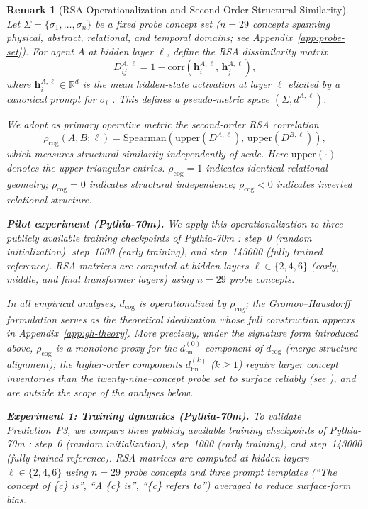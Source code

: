 \documentclass[12pt]{article}
\newtheorem{remark}{Remark}
\begin{document}
\begin{remark}[RSA Operationalization and Second-Order Structural Similarity]
\label{rem:rsa-operationalization}
Let $\Sigma = \{\sigma_1, \ldots, \sigma_n\}$ be a fixed probe concept
set ($n = 29$ concepts spanning physical, abstract, relational,
and temporal domains; see Appendix~\ref{app:probe-set}).
For agent $A$ at hidden layer $\ell$, define the RSA dissimilarity matrix
\[
D^{A,\ell}_{ij} = 1 - \mathrm{corr}(\mathbf{h}^{A,\ell}_i,\, \mathbf{h}^{A,\ell}_j),
\]
where $\mathbf{h}^{A,\ell}_i \in \mathbb{R}^d$ is the mean hidden-state
activation at layer $\ell$ elicited by a canonical prompt for $\sigma_i$
\cite{kriegeskorte2008}.
This defines a pseudo-metric space $(\Sigma, d^{A,\ell})$.

We adopt as primary operative metric the \emph{second-order RSA correlation}
\[
\rho_\mathrm{cog}(A, B;\ell)
  = \mathrm{Spearman}\!\left(
      \mathrm{upper}(D^{A,\ell}),\,
      \mathrm{upper}(D^{B,\ell})
    \right),
\]
which measures structural similarity independently of scale.
Here $\mathrm{upper}(\cdot)$ denotes the upper-triangular entries.
$\rho_\mathrm{cog} = 1$ indicates identical relational geometry;
$\rho_\mathrm{cog} = 0$ indicates structural independence;
$\rho_\mathrm{cog} < 0$ indicates inverted relational structure.

\smallskip
\noindent\textbf{Pilot experiment (Pythia-70m).}
We apply this operationalization to three publicly available training
checkpoints of Pythia-70m \cite{biderman2023}:
step~0 (random initialization), step~1000 (early training),
and step~143000 (fully trained reference).
RSA matrices are computed at hidden layers $\ell \in \{2, 4, 6\}$
(early, middle, and final transformer layers) using $n = 29$ probe concepts.

\noindent
In all empirical analyses, $d_\mathrm{cog}$ is operationalized by
$\rho_\mathrm{cog}$; the Gromov--Hausdorff formulation serves as the
theoretical idealization whose full construction appears in
Appendix~\ref{app:gh-theory}.
More precisely, under the signature form introduced above,
$\rho_\mathrm{cog}$ is a monotone proxy for the
$d_\mathrm{bn}^{(0)}$ component of $d_\mathrm{cog}$ (merge-structure
alignment); the higher-order components $d_\mathrm{bn}^{(k)}$
($k \geq 1$) require larger concept inventories than the
twenty-nine--concept probe set to surface reliably
(see \cite[App.~\ref{app:dcog-h1}]{minamoto2026topology}), and are
outside the scope of the analyses below.

\noindent\textbf{Experiment 1: Training dynamics (Pythia-70m).}
To validate Prediction~P3, we compare three publicly available
training checkpoints of Pythia-70m \cite{biderman2023}:
step~0 (random initialization), step~1000 (early training),
and step~143000 (fully trained reference).
RSA matrices are computed at hidden layers $\ell \in \{2, 4, 6\}$
using $n = 29$ probe concepts and three prompt templates
(\textit{``The concept of \{c\} is'', ``A \{c\} is'', ``\{c\} refers to''})
averaged to reduce surface-form bias.


\end{remark}
\end{document}
